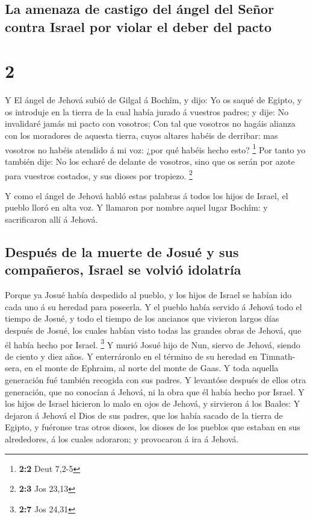 \hypertarget{la-amenaza-de-castigo-del-uxe1ngel-del-seuxf1or-contra-israel-por-violar-el-deber-del-pacto}{%
\subsection{La amenaza de castigo del ángel del Señor contra Israel por
violar el deber del
pacto}\label{la-amenaza-de-castigo-del-uxe1ngel-del-seuxf1or-contra-israel-por-violar-el-deber-del-pacto}}

\hypertarget{section-1}{%
\section{2}\label{section-1}}

 Y El ángel de Jehová subió de Gilgal á Bochîm, y dijo: Yo
os saqué de Egipto, y os introduje en la tierra de la cual había jurado
á vuestros padres; y dije: No invalidaré jamás mi pacto con vosotros;
 Con tal que vosotros no hagáis alianza con los moradores
de aquesta tierra, cuyos altares habéis de derribar: mas vosotros no
habéis atendido á mi voz: ¿por qué habéis hecho esto? \footnote{\textbf{2:2}
  Deut 7,2-5}  Por tanto yo también dije: No los echaré de
delante de vosotros, sino que os serán por azote para vuestros costados,
y sus dioses por tropiezo. \footnote{\textbf{2:3} Jos 23,13}

 Y como el ángel de Jehová habló estas palabras á todos
los hijos de Israel, el pueblo lloró en alta voz.  Y
llamaron por nombre aquel lugar Bochîm: y sacrificaron allí á Jehová.

\hypertarget{despuuxe9s-de-la-muerte-de-josuuxe9-y-sus-compauxf1eros-israel-se-volviuxf3-idolatruxeda}{%
\subsection{Después de la muerte de Josué y sus compañeros, Israel se
volvió
idolatría}\label{despuuxe9s-de-la-muerte-de-josuuxe9-y-sus-compauxf1eros-israel-se-volviuxf3-idolatruxeda}}

 Porque ya Josué había despedido al pueblo, y los hijos de
Israel se habían ido cada uno á su heredad para poseerla. 
Y el pueblo había servido á Jehová todo el tiempo de Josué, y todo el
tiempo de los ancianos que vivieron largos días después de Josué, los
cuales habían visto todas las grandes obras de Jehová, que él había
hecho por Israel. \footnote{\textbf{2:7} Jos 24,31}  Y
murió Josué hijo de Nun, siervo de Jehová, siendo de ciento y diez años.
 Y enterráronlo en el término de su heredad en
Timnath-sera, en el monte de Ephraim, al norte del monte de Gaas.
 Y toda aquella generación fué también recogida con sus
padres. Y levantóse después de ellos otra generación, que no conocían á
Jehová, ni la obra que él había hecho por Israel.  Y los
hijos de Israel hicieron lo malo en ojos de Jehová, y sirvieron á los
Baales:  Y dejaron á Jehová el Dios de sus padres, que
los había sacado de la tierra de Egipto, y fuéronse tras otros dioses,
los dioses de los pueblos que estaban en sus alrededores, á los cuales
adoraron; y provocaron á ira á Jehová.

